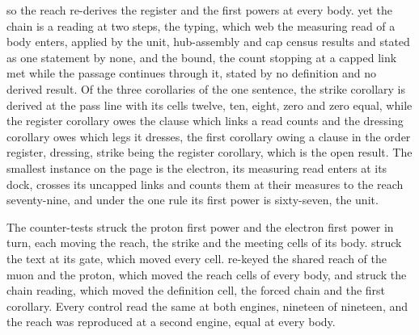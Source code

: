 \begin{chproof}
so the reach re-derives the register and the first powers at every body. yet the chain is a reading at two steps, the typing, which web the measuring read of a body enters, applied by the unit, hub-assembly and cap census results and stated as one statement by none, and the bound, the count stopping at a capped link met while the passage continues through it, stated by no definition and no derived result. Of the three corollaries of the one sentence, the strike corollary is derived at the pass line with its cells twelve, ten, eight, zero and zero equal, while the register corollary owes the clause which links a read counts and the dressing corollary owes which legs it dresses, the first corollary owing a clause in the order register, dressing, strike being the register corollary, which is the open result. The smallest instance on the page is the electron, its measuring read enters at its dock, crosses its uncapped links and counts them at their measures to the reach seventy-nine, and under the one rule its first power is sixty-seven, the unit.

The counter-tests struck the proton first power and the electron first power in turn, each moving the reach, the strike and the meeting cells of its body. struck the text at its gate, which moved every cell. re-keyed the shared reach of the muon and the proton, which moved the reach cells of every body, and struck the chain reading, which moved the definition cell, the forced chain and the first corollary. Every control read the same at both engines, nineteen of nineteen, and the reach was reproduced at a second engine, equal at every body.
\end{chproof}
\par\medskip{}\label{narr:close:1-6}\par
